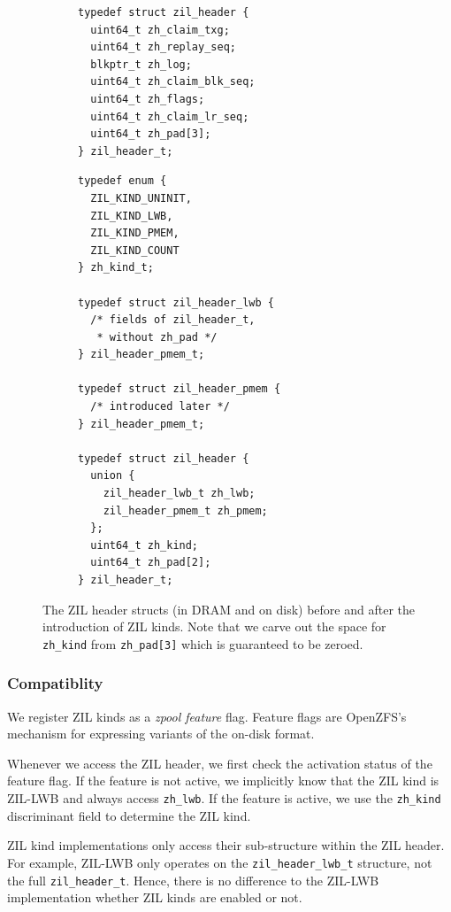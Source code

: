 \documentclass[12pt,a4paper,twoside]{book}
\begin{document}
\begin{figure}[H]
\begin{subfigure}[t]{0.45\textwidth}
\begin{lstlisting}[basicstyle=\scriptsize\ttfamily]
typedef struct zil_header {
  uint64_t zh_claim_txg;
  uint64_t zh_replay_seq;
  blkptr_t zh_log;
  uint64_t zh_claim_blk_seq;
  uint64_t zh_flags;
  uint64_t zh_claim_lr_seq;
  uint64_t zh_pad[3];
} zil_header_t;
\end{lstlisting}
\end{subfigure}
\hfill
\begin{subfigure}[t]{0.5\textwidth}
\begin{lstlisting}[basicstyle=\scriptsize\ttfamily]
typedef enum {
  ZIL_KIND_UNINIT,
  ZIL_KIND_LWB,
  ZIL_KIND_PMEM,
  ZIL_KIND_COUNT
} zh_kind_t;

typedef struct zil_header_lwb {
  /* fields of zil_header_t,
   * without zh_pad */
} zil_header_pmem_t;

typedef struct zil_header_pmem {
  /* introduced later */
} zil_header_pmem_t;

typedef struct zil_header {
  union {
    zil_header_lwb_t zh_lwb;
    zil_header_pmem_t zh_pmem;
  };
  uint64_t zh_kind;
  uint64_t zh_pad[2];
} zil_header_t;

\end{lstlisting}
\end{subfigure}
\caption{The ZIL header structs (in DRAM and on disk) before and after the introduction of ZIL kinds. Note that we carve out the space for \lstinline{zh_kind} from \lstinline{zh_pad[3]} which is guaranteed to be zeroed.}
\label{lst:zil_header_before_and_after}
\end{figure}

\subsubsection{Compatiblity}

We register ZIL kinds as a \textit{zpool feature} flag.
Feature flags are OpenZFS's mechanism for expressing variants of the on-disk format.

Whenever we access the ZIL header, we first check the activation status of the feature flag.
If the feature is not active, we implicitly know that the ZIL kind is ZIL-LWB and always access \lstinline{zh_lwb}.
If the feature is active, we use the \lstinline{zh_kind} discriminant field to determine the ZIL kind.

ZIL kind implementations only access their sub-structure within the ZIL header.
For example, ZIL-LWB only operates on the \lstinline{zil_header_lwb_t} structure, not the full \lstinline{zil_header_t}.
Hence, there is no difference to the ZIL-LWB implementation whether ZIL kinds are enabled or not.
\end{document}
